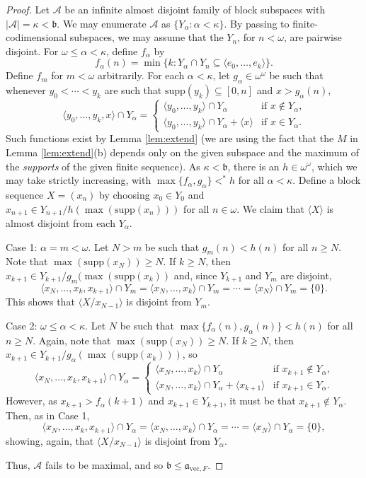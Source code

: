 \documentclass[11pt]{amsart}
\newcommand{\LA}{\mathcal{A}}
\renewcommand{\b}{\mathfrak{b}}
\renewcommand{\a}{\mathfrak{a}}
\theoremstyle{definition}
\theoremstyle{remark}
\newcommand{\supp}{\mathrm{supp}}
\renewcommand{\1}{\mathbf{1}}
\begin{document}
\begin{proof}
	Let $\LA$ be an infinite almost disjoint family of block subspaces with $|\LA|=\kappa<\b$. We may enumerate $\LA$ as $\{Y_\alpha:\alpha<\kappa\}$. By passing to finite-codimensional subspaces, we may assume that the $Y_n$, for $n<\omega$, are pairwise disjoint. For $\omega\leq\alpha<\kappa$, define $f_\alpha$ by
	\[
		f_\alpha(n)=\min\{k: Y_\alpha\cap Y_n\subseteq\langle e_0,\ldots,e_k\rangle\}.
	\]
	Define $f_m$ for $m<\omega$ arbitrarily. For each $\alpha<\kappa$, let $g_\alpha\in\omega^\omega$ be such that whenever $y_0<\cdots<y_k$ are such that $\supp(y_k)\subseteq[0,n]$ and $x>g_\alpha(n)$,
	\[
		\langle y_0,\ldots,y_k,x\rangle\cap Y_\alpha=\begin{cases} \langle y_0,\ldots,y_k\rangle\cap Y_\alpha &\text{if $x\notin Y_\alpha$,}\\ \langle y_0,\ldots,y_k\rangle\cap Y_\alpha+\langle x\rangle &\text{if $x\in Y_\alpha$.}\end{cases}
	\] 
	Such functions exist by Lemma \ref{lem:extend} (we are using the fact that the $M$ in Lemma \ref{lem:extend}(b) depends only on the given subspace and the maximum of the \emph{supports} of the given finite sequence). As $\kappa<\b$, there is an $h\in\omega^\omega$, which we may take strictly increasing, with $\max\{f_\alpha,g_\alpha\}<^*h$ for all $\alpha<\kappa$. Define a block sequence $X=(x_n)$ by choosing $x_0\in Y_0$ and $x_{n+1}\in Y_{n+1}/h(\max(\supp(x_n)))$ for all $n\in\omega$. We claim that $\langle X\rangle$ is almost disjoint from each $Y_\alpha$.
	
	Case 1: $\alpha=m<\omega$. Let $N> m$ be such that $g_m(n)<h(n)$ for all $n\geq N$. Note that $\max(\supp(x_N))\geq N$. If $k\geq N$, then $x_{k+1}\in Y_{k+1}/g_m(\max(\supp(x_{k}))$ and, since $Y_{k+1}$ and $Y_m$ are disjoint,
	\[
		\langle x_N,\ldots,x_{k},x_{k+1}\rangle\cap Y_m=\langle x_N,\ldots,x_{k}\rangle\cap Y_m=\cdots=\langle x_N\rangle\cap Y_m=\{0\}.
	\]
	This shows that $\langle X/x_{N-1}\rangle$ is disjoint from $Y_m$.
	
	Case 2: $\omega\leq\alpha<\kappa$. Let $N$ be such that $\max\{f_\alpha(n),g_\alpha(n)\}<h(n)$ for all $n\geq N$. Again, note that $\max(\supp(x_N))\geq N$. If $k\geq N$, then $x_{k+1}\in Y_{k+1}/g_\alpha(\max(\supp(x_k)))$, so
	\[
		\langle x_N,\ldots,x_k,x_{k+1}\rangle\cap Y_\alpha=\begin{cases} \langle x_N,\ldots,x_k\rangle\cap Y_\alpha &\text{if $x_{k+1}\notin Y_\alpha$,}\\ \langle x_N,\ldots,x_k\rangle\cap Y_\alpha+\langle x_{k+1}\rangle &\text{if $x_{k+1}\in Y_\alpha$.}\end{cases}
	\]
	However, as $x_{k+1}>f_\alpha(k+1)$ and $x_{k+1}\in Y_{k+1}$, it must be that $x_{k+1}\notin Y_\alpha$. Then, as in Case 1,
	\[
		\langle x_N,\ldots,x_{k},x_{k+1}\rangle\cap Y_\alpha=\langle x_N,\ldots,x_{k}\rangle\cap Y_\alpha=\cdots=\langle x_N\rangle\cap Y_\alpha=\{0\},
	\]
	showing, again, that $\langle X/x_{N-1}\rangle$ is disjoint from $Y_\alpha$. 
	
	Thus, $\LA$ fails to be maximal, and so $\b\leq\a_{\mathrm{vec},F}$.
\end{proof}
\end{document}
